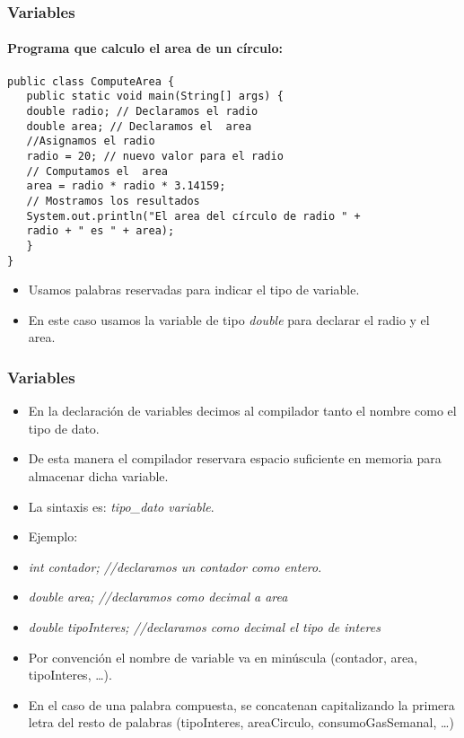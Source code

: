 \documentclass{beamer}
\begin{document}
\begin{frame}[fragile]
    \frametitle{Variables}
    \framesubtitle{Programa que calculo el area de un círculo:}
    \begin{verbatim}
public class ComputeArea {
   public static void main(String[] args) {
   double radio; // Declaramos el radio
   double area; // Declaramos el  area
   //Asignamos el radio
   radio = 20; // nuevo valor para el radio
   // Computamos el  area
   area = radio * radio * 3.14159;
   // Mostramos los resultados
   System.out.println("El area del círculo de radio " +
   radio + " es " + area);
   }
}
\end{verbatim}
\pause
\begin{itemize}[<+-| alert@+>]
      \item Usamos palabras reservadas para indicar el tipo de variable.
      \item En este caso usamos la variable de tipo \emph{double} para declarar el radio y el area.
\end{itemize}
\pause

\end{frame}

\begin{frame}
    \frametitle{Variables}

\begin{itemize}[<+-| alert@+>]
      \item En la declaración de variables decimos al compilador tanto el nombre como el tipo de dato.
      \item De esta manera el compilador reservara espacio suficiente en memoria para almacenar dicha variable.
      \item La sintaxis es: \emph{tipo\_dato variable}.
      \item Ejemplo:
      \item \emph{int contador; //declaramos un contador como entero}.
      \item \emph{double area; //declaramos como decimal a area}
      \item \emph{double tipoInteres; //declaramos como decimal el tipo de interes} 
      \item Por convención el nombre de variable va en minúscula (contador, area, tipoInteres, \dots).    
      \item En el caso de una palabra compuesta, se concatenan capitalizando la primera letra del resto de palabras (tipoInteres, areaCirculo, consumoGasSemanal, \dots)
      \end{itemize}
      \pause

\end{frame}
\end{document}
